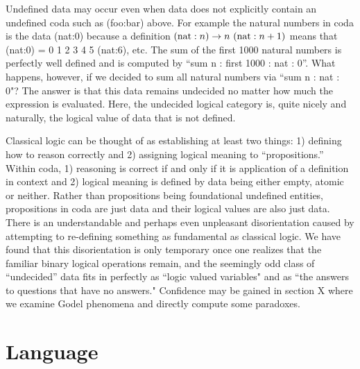 \documentclass[11pt]{article}
\begin{document}
Undefined data may occur even when data does not explicitly contain an undefined coda such as (foo:bar) above. For example 
the natural numbers in coda is the data (nat:0) because a definition $({\rm nat}:n)\rightarrow n\ ({\rm nat}:n+1)$ means that (nat:0) = 0 1 2 3 4 5 (nat:6), etc.  
The sum of the first 1000 natural numbers is perfectly well defined and is computed by ``sum n : first 1000 : nat : 0''.  What happens, however, 
if we decided to sum all natural numbers via ``sum n : nat : 0"?  The answer is that this data remains undecided no matter how much the 
expression is evaluated.  Here, the undecided logical category is, quite nicely and naturally, the logical value of data that is not defined.  

Classical logic can be thought of as establishing at least two things: 1) defining how to reason correctly and 2) assigning logical meaning to ``propositions.''  
Within coda, 1) reasoning is correct if and only if it is application of a definition in context and 2) logical meaning is defined by data being either empty, atomic or neither.  
Rather than propositions being foundational undefined entities, propositions in coda are just data and their logical values are also just data.  
There is an understandable and perhaps even unpleasant disorientation caused by attempting to re-defining something 
as fundamental as classical logic.  We have found that this disorientation is only temporary once one realizes that the familiar binary logical operations remain,
 and the seemingly odd class of ``undecided'' data fits in perfectly as ``logic valued variables" and as ``the answers to questions that have no answers."  Confidence may 
 be gained in section X where we examine Godel phenomena and directly compute some paradoxes. 

\section{Language}
\end{document}

